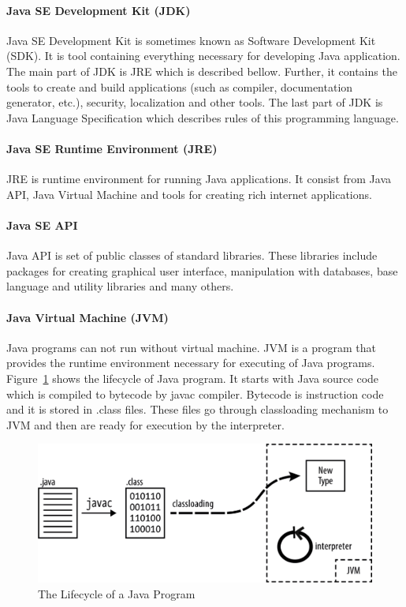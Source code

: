 \paragraph{Java SE Development Kit (JDK)}
Java SE Development Kit is sometimes known as Software Development Kit (SDK). It is tool containing everything necessary for developing Java application. The main part of JDK is JRE which is described bellow. Further, it contains the tools to create and build applications (such as compiler, documentation generator, etc.), security, localization and other tools. The last part of JDK is Java Language Specification which describes rules of this programming language.

\paragraph{Java SE Runtime Environment (JRE)}
JRE is runtime environment for running Java applications. It consist from Java API, Java Virtual Machine and tools for creating rich internet applications.

\paragraph{Java SE API}
Java API is set of public classes of standard libraries. These libraries include packages for creating graphical user interface, manipulation with databases, base language and utility libraries and many others.

\paragraph{Java Virtual Machine (JVM)}
Java programs can not run without virtual machine. JVM is a program that provides the runtime environment necessary for executing of Java programs. Figure~\ref{JavaLifecycle} shows the lifecycle of Java program. It starts with Java source code which is compiled to bytecode by javac compiler. Bytecode is instruction code  and it is stored in .class files. These files go through classloading mechanism to JVM and then are ready for execution by the interpreter.
\\
\begin{figure}[h!]
    \centering
    \includegraphics[scale=0.3]{fig/java_program_lifecycle.png}
    \caption{The Lifecycle of a Java Program}
    \label{JavaLifecycle}
\end{figure}
